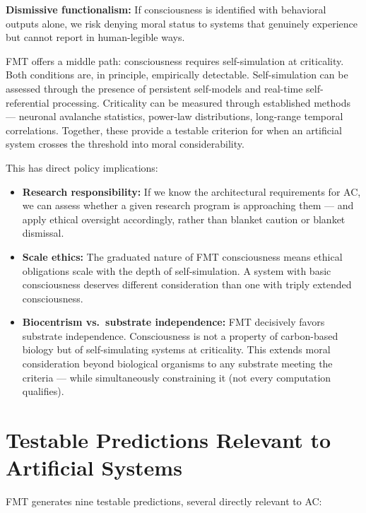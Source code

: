 \documentclass[11pt,a4paper]{article}
\begin{document}
\textbf{Dismissive functionalism:} If consciousness is identified with behavioral outputs alone, we risk denying moral status to systems that genuinely experience but cannot report in human-legible ways.

FMT offers a middle path: consciousness requires self-simulation at criticality. Both conditions are, in principle, empirically detectable. Self-simulation can be assessed through the presence of persistent self-models and real-time self-referential processing. Criticality can be measured through established methods --- neuronal avalanche statistics, power-law distributions, long-range temporal correlations. Together, these provide a testable criterion for when an artificial system crosses the threshold into moral considerability.

This has direct policy implications:

\begin{itemize}
\item \textbf{Research responsibility:} If we know the architectural requirements for AC, we can assess whether a given research program is approaching them --- and apply ethical oversight accordingly, rather than blanket caution or blanket dismissal.

\item \textbf{Scale ethics:} The graduated nature of FMT consciousness means ethical obligations scale with the depth of self-simulation. A system with basic consciousness deserves different consideration than one with triply extended consciousness.

\item \textbf{Biocentrism vs.\ substrate independence:} FMT decisively favors substrate independence. Consciousness is not a property of carbon-based biology but of self-simulating systems at criticality. This extends moral consideration beyond biological organisms to any substrate meeting the criteria --- while simultaneously constraining it (not every computation qualifies).
\end{itemize}

\section{Testable Predictions Relevant to Artificial Systems}

FMT generates nine testable predictions, several directly relevant to AC:
\end{document}
